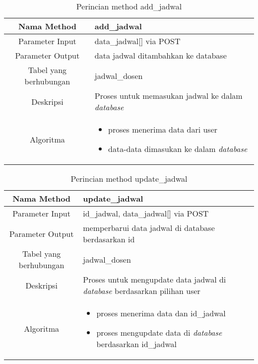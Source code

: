 \begin{center}
\begin{table}[H]
\caption{Perincian method add\_jadwal}
\begin{tabular}{|c|p{11cm}|}
\hline
Nama Method 	& 	add\_jadwal 	\\
\hline
Parameter Input & data\_jadwal[] via POST \\
\hline
Parameter Output & data jadwal ditambahkan ke database \\
\hline
Tabel yang berhubungan & jadwal\_dosen \\
\hline
Deskripsi	& Proses untuk memasukan jadwal ke dalam \textit{database} \\
\hline
Algoritma	& \begin{itemize}
				\item proses menerima data dari user
				\item data-data dimasukan ke dalam \textit{database}
				\end{itemize} \\
\hline
\end{tabular}
\end{table}
\end{center}


\begin{center}
\begin{table}[H]
\caption{Perincian method update\_jadwal}
\begin{tabular}{|c|p{11cm}|}
\hline
Nama Method 	& 	update\_jadwal 	\\
\hline
Parameter Input & id\_jadwal, data\_jadwal[] via POST \\
\hline
Parameter Output & memperbarui data jadwal di database berdasarkan id \\
\hline
Tabel yang berhubungan & jadwal\_dosen \\
\hline
Deskripsi	& Proses untuk mengupdate data jadwal di \textit{database} berdasarkan pilihan user\\
\hline
Algoritma	& \begin{itemize}
				\item proses menerima data dan id\_jadwal
				\item proses mengupdate data di \textit{database} berdasarkan id\_jadwal
				\end{itemize} \\
\hline
\end{tabular}
\end{table}
\end{center}


